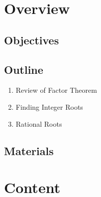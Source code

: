 \section{Overview}

\subsection{Objectives}

\subsection{Outline}

\begin{enumerate}
    \item Review of Factor Theorem
    \item Finding Integer Roots
    \item Rational Roots
\end{enumerate}

\subsection{Materials}

\section{Content}